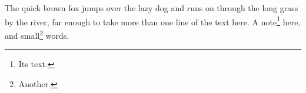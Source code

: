 \documentclass{article}
\begin{document}
The quick brown fox jumps over the lazy dog and runs on through the long grass by the river, far enough to take more than one line of the text here. A note\footnote{Its text.} here, {\small and small\footnote{Another.} words}.
\end{document}

